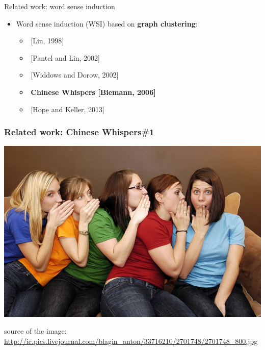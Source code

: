 \begin{frame}{Related work: word sense induction}

\begin{itemize}
	\item Word sense induction (WSI) based on \alert{\textbf{graph clustering}}:  
	\begin{itemize}
	\item $ $ [Lin, 1998]
	\item $ $ [Pantel and Lin, 2002]
	\item $ $ [Widdows and Dorow, 2002]
	\item $ $ \textbf{Chinese Whispers [Biemann, 2006]}
	\item $ $ [Hope and Keller, 2013]
	\end{itemize}
	
\end{itemize}
	

\end{frame}



\begin{frame}[fragile]
\frametitle{Related work: Chinese Whispers\#1}
\begin{center}
 \includegraphics[height=0.5\textwidth]{cw}
 
  {\tiny * source of the image: \url{http://ic.pics.livejournal.com/blagin_anton/33716210/2701748/2701748_800.jpg}}
 \end{center}
\end{frame}




